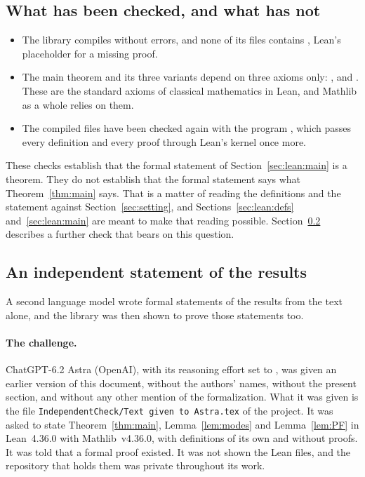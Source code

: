 \documentclass[11pt]{article}
\theoremstyle{definition}
\theoremstyle{remark}
\begin{document}
\subsection{What has been checked, and what has not}\label{sec:lean:checked}

\begin{itemize}[leftmargin=2em]
  \item The library  compiles without errors, and none of its
        files contains , Lean's placeholder for a missing proof.
  \item The main theorem and its three variants depend on three axioms only: ,
         and . These are the standard axioms of
        classical mathematics in Lean, and Mathlib as a whole relies on them.
  \item The compiled files have been checked again with the program , which
        passes every definition and every proof through Lean's kernel once more.
\end{itemize}

These checks establish that the formal statement of Section~\ref{sec:lean:main} is a theorem.
They do not establish that the formal statement says what Theorem~\ref{thm:main} says. That is a
matter of reading the definitions and the statement against Section~\ref{sec:setting}, and
Sections~\ref{sec:lean:defs} and~\ref{sec:lean:main} are meant to make that reading possible.
Section~\ref{sec:lean:independent} describes a further check that bears on this question.

\subsection{An independent statement of the results}\label{sec:lean:independent}

A second language model wrote formal statements of the results from the text alone, and the
library was then shown to prove those statements too.

\paragraph{The challenge.}
ChatGPT-6.2 Astra (OpenAI), with its reasoning effort set to , was given an earlier
version of this document, without the authors' names, without the present section, and without
any other mention of the formalization. What it was given is the file
\texttt{IndependentCheck/Text given to Astra.tex} of the project. It was asked to state Theorem~\ref{thm:main}, Lemma~\ref{lem:modes} and
Lemma~\ref{lem:PF} in Lean~4.36.0 with Mathlib~v4.36.0, with definitions of its own and without
proofs. It was told that a formal proof existed. It was not shown the Lean files, and the
repository that holds them was private throughout its work.
\end{document}
